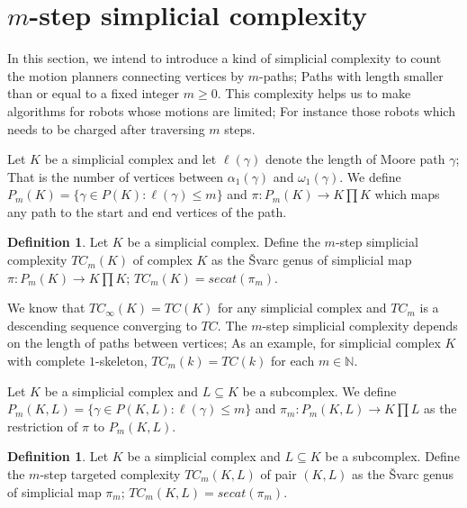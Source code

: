\documentclass[preprint,11pt %
]{hjm1}
\theoremstyle{definition}
\newtheorem{definition}[theorem]{Definition}
\begin{document}
\section{$m$-step simplicial complexity}

In this section, we intend to introduce a kind of simplicial complexity to count the motion planners connecting vertices by $m$-paths; Paths with length smaller than or equal to a fixed integer $m \ge 0$. This complexity helps us to make algorithms for robots whose motions are limited; For instance those robots which needs to be charged after traversing $m$ steps. 

Let $K$ be a simplicial complex and let $\ell (\gamma)$ denote the length of Moore path $\gamma$; That is the number of vertices between $\alpha_1 (\gamma)$ and $\omega_1(\gamma)$. We define $P_m(K)=\lbrace \gamma \in P(K) : \ell (\gamma) \le m\} $ and $\pi :P_m(K)\to K\prod K$ which maps any path to the start and end vertices of the path.

\begin{definition}
Let $K$ be a simplicial complex. Define the $m$-step simplicial complexity $TC_m(K)$ of complex $K$ as the \v{S}varc genus of simplicial map $\pi: P_m(K)\to K\prod K$; $TC_m(K) = secat (\pi_m)$.
\end{definition}

We know that $TC_{\infty}(K) = TC (K)$ for any simplicial complex and $TC_m$ is a descending sequence converging to $TC$. 
The $m$-step simplicial complexity depends on the length of paths between vertices; As an example, for simplicial complex $K$ with complete $1$-skeleton, $TC_m (k)= TC (k)$ for each $m \in \mathbb{N}$.


Let $K$ be a simplicial complex and $L\subseteq K$ be a subcomplex. %
We define $P_m(K,L)=\lbrace \gamma \in P(K,L) : \ell (\gamma) \le m\} $ and $\pi_m :P_m(K,L)\to K\prod  L$ as the restriction
of $\pi$ to $P_m(K,L)$.

\begin{definition}
Let $K$ be a simplicial complex and $L\subseteq K$ be a subcomplex. Define the $m$-step targeted complexity $TC_m(K,L)$ of pair $(K,L)$ as the \v{S}varc genus of simplicial map $\pi_m$; $TC_m(K,L) = secat (\pi_m)$.
\end{definition}
\end{document}
